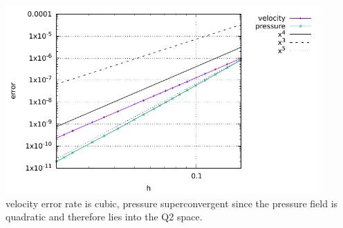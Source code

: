 \begin{center}
\includegraphics[width=12cm]{python_codes/fieldstone_19/results/errors}\\
{\captionfont velocity error rate is cubic, pressure superconvergent since the pressure field
is quadratic and therefore lies into the Q2 space.}
\end{center}

